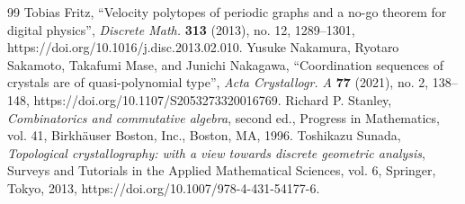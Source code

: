 \documentclass[10pt,a4paper]{amsart}
\theoremstyle{plain}
\theoremstyle{definition}
\theoremstyle{remark}
\begin{document}
\begin{thebibliography}{99}
 Tobias Fritz, ``Velocity polytopes of periodic graphs and a no-go theorem for digital physics'', \emph{Discrete Math.} \textbf{313} (2013), no. 12, 1289--1301, https://doi.org/10.1016/j.disc.2013.02.010.
 Yusuke Nakamura, Ryotaro Sakamoto, Takafumi Mase, and Junichi Nakagawa, ``Coordination sequences of crystals are of quasi-polynomial type'', \emph{Acta Crystallogr. A} \textbf{77} (2021), no. 2, 138--148, https://doi.org/10.1107/S2053273320016769.
 Richard P. Stanley, \emph{Combinatorics and commutative algebra}, second ed., Progress in Mathematics, vol. 41, Birkh\"auser Boston, Inc., Boston, MA, 1996.
 Toshikazu Sunada, \emph{Topological crystallography: with a view towards discrete geometric analysis}, Surveys and Tutorials in the Applied Mathematical Sciences, vol. 6, Springer, Tokyo, 2013, https://doi.org/10.1007/978-4-431-54177-6.
\end{thebibliography}
\end{document}
